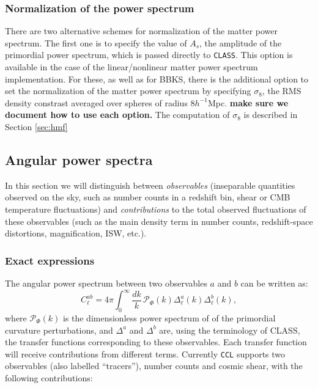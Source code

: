 \documentclass[\docopts]{\docclass}
\begin{document}
\subsubsection{Normalization of the power spectrum}
\label{sec:PSnorm}

There are two alternative schemes for normalization of the matter power spectrum. The first one is to specify the value of $A_s$, the amplitude of the primordial power spectrum, which is passed directly to {\tt CLASS}. This option is available in the case of the linear/nonlinear matter power spectrum implementation. For these, as well as for BBKS, there is the additional option to set the normalization of the matter power spectrum by specifying $\sigma_8$, the RMS density constrast averaged over spheres of radius $8h^{-1}$Mpc. {\bf make sure we document how to use each option.} The computation of $\sigma_8$ is described in Section \ref{sec:hmf}

\subsection{Angular power spectra}
\label{sec:cl}

In this section we will distinguish between {\sl observables} (inseparable quantities observed on the sky, such as number counts in a redshift bin, shear or CMB temperature fluctuations) and {\sl contributions} to the total observed fluctuations of these observables (such as the main density term in number counts, redshift-space distortions, magnification, ISW, etc.).

\subsubsection{Exact expressions}
The angular power spectrum between two observables $a$ and $b$ can be written as:
\begin{equation}
 C^{ab}_\ell=4\pi\int_0^\infty \frac{dk}{k}\,\mathcal{P}_\Phi(k)\Delta^a_\ell(k)\Delta^b_\ell(k),
\end{equation}
where $\mathcal{P}_\Phi(k)$ is the dimensionless power spectrum of of the primordial curvature perturbations, and $\Delta^a$ and $\Delta^b$ are, using the terminology of CLASS, the transfer functions corresponding to these observables. Each transfer function will receive contributions from different terms. Currently {\tt CCL} supports two observables (also labelled ``tracers''), number counts and cosmic shear, with the following contributions:
\end{document}
